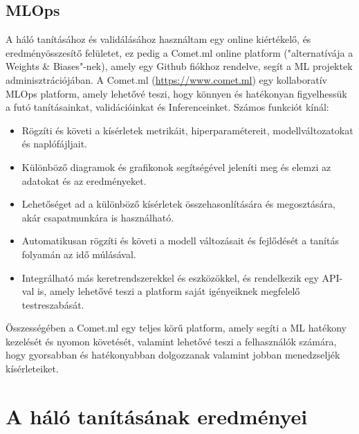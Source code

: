 \documentclass[12pt,oneside,a4paper]{article}
\newcommand{\newsection}[1]{\clearpage\section{#1}}\label{makro}
\theoremstyle{remark}
\begin{document}
	\subsection{MLOps}\label{subsec:MLOps}
	A háló tanításához és validálásához használtam egy online kiértékelő, és eredményösszesítő felületet, ez pedig a Comet.ml online platform ("alternatívája a Weights \& Biases"-nek), amely egy Github fiókhoz rendelve, segít a \ac{ML} projektek adminisztrációjában.
	A Comet.ml (\url{https://www.comet.ml}) egy kollaboratív \ac{MLOps} platform, amely lehetővé teszi, hogy könnyen és
	hatékonyan figyelhessük a futó tanításainkat, validációinkat és \gls{Inference}inket.
	Számos funkciót kínál:
	\begin{itemize}
		\item Rögzíti és követi a kísérletek metrikáit, hiperparamétereit, modellváltozatokat és naplófájljait.
		\item Különböző diagramok és grafikonok segítségével jeleníti meg és elemzi az adatokat és az eredményeket.
		\item Lehetőséget ad a különböző kísérletek összehasonlítására és megosztására, akár csapatmunkára is használható.
		\item Automatikusan rögzíti és követi a modell változásait és fejlődését a tanítás folyamán az idő múlásával.
		\item Integrálható más keretrendszerekkel és eszközökkel, és rendelkezik egy API-val is, amely lehetővé teszi a platform
		saját igényeiknek megfelelő testreszabását.
	\end{itemize}
	Összességében a Comet.ml egy teljes körű platform, amely segíti a \ac{ML} hatékony kezelését
	és nyomon követését, valamint lehetővé teszi a felhasználók számára, hogy gyorsabban és hatékonyabban dolgozzanak
	valamint jobban menedzseljék kísérleteiket.
	
	
	\newsection{A háló tanításának eredményei}\label{sec:haloperformancia}
	
    
\end{document}
